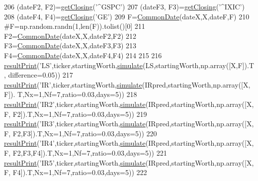 \begin{DoxyCode}
{206     (dateF2, F2)=\hyperlink{namespacestocks_a44235135cad9d919663b15452cf3e613}{getClosing}(\textcolor{stringliteral}{'^GSPC'})
207     (dateF3, F3)=\hyperlink{namespacestocks_a44235135cad9d919663b15452cf3e613}{getClosing}(\textcolor{stringliteral}{'^IXIC'})
208     (dateF4, F4)=\hyperlink{namespacestocks_a44235135cad9d919663b15452cf3e613}{getClosing}(\textcolor{stringliteral}{'GE'})
209     F=\hyperlink{namespacestocks_a5ce0ea6dd1cb1e1baf78fbb4313b64b9}{CommonDate}(dateX,X,dateF,F)
210     \textcolor{comment}{#F=np.random.randn(1,len(F)).tolist()[0]}
211     F2=\hyperlink{namespacestocks_a5ce0ea6dd1cb1e1baf78fbb4313b64b9}{CommonDate}(dateX,X,dateF2,F2)
212     F3=\hyperlink{namespacestocks_a5ce0ea6dd1cb1e1baf78fbb4313b64b9}{CommonDate}(dateX,X,dateF3,F3)
213     F4=\hyperlink{namespacestocks_a5ce0ea6dd1cb1e1baf78fbb4313b64b9}{CommonDate}(dateX,X,dateF4,F4)
214 
215 
216     \hyperlink{namespacestocks_ac80b7d5d1cdc027b7a0e2e19093baf9b}{resultPrint}(\textcolor{stringliteral}{'LS'},ticker,startingWorth,\hyperlink{namespacestocks_a6217dcad564ba6361c3cca44542ba220}{simulate}(LS,startingWorth,np.array([X,F]).T,
      difference=0.05))
217     \hyperlink{namespacestocks_ac80b7d5d1cdc027b7a0e2e19093baf9b}{resultPrint}(\textcolor{stringliteral}{'IR'},ticker,startingWorth,\hyperlink{namespacestocks_a6217dcad564ba6361c3cca44542ba220}{simulate}(IRpred,startingWorth,np.array([X,F]).
      T,Nx=1,Nf=7,ratio=0.03,days=5))
218     \hyperlink{namespacestocks_ac80b7d5d1cdc027b7a0e2e19093baf9b}{resultPrint}(\textcolor{stringliteral}{'IR2'},ticker,startingWorth,\hyperlink{namespacestocks_a6217dcad564ba6361c3cca44542ba220}{simulate}(IRpred,startingWorth,np.array([X,F,
      F2]).T,Nx=1,Nf=7,ratio=0.03,days=5))
219     \hyperlink{namespacestocks_ac80b7d5d1cdc027b7a0e2e19093baf9b}{resultPrint}(\textcolor{stringliteral}{'IR3'},ticker,startingWorth,\hyperlink{namespacestocks_a6217dcad564ba6361c3cca44542ba220}{simulate}(IRpred,startingWorth,np.array([X,F,
      F2,F3]).T,Nx=1,Nf=7,ratio=0.03,days=5))
220     \hyperlink{namespacestocks_ac80b7d5d1cdc027b7a0e2e19093baf9b}{resultPrint}(\textcolor{stringliteral}{'IR4'},ticker,startingWorth,\hyperlink{namespacestocks_a6217dcad564ba6361c3cca44542ba220}{simulate}(IRpred,startingWorth,np.array([X,F,
      F2,F3,F4]).T,Nx=1,Nf=7,ratio=0.03,days=5))
221     \hyperlink{namespacestocks_ac80b7d5d1cdc027b7a0e2e19093baf9b}{resultPrint}(\textcolor{stringliteral}{'IR5'},ticker,startingWorth,\hyperlink{namespacestocks_a6217dcad564ba6361c3cca44542ba220}{simulate}(IRpred,startingWorth,np.array([X,F,
      F4]).T,Nx=1,Nf=7,ratio=0.03,days=5))
222 
}
\end{DoxyCode}
